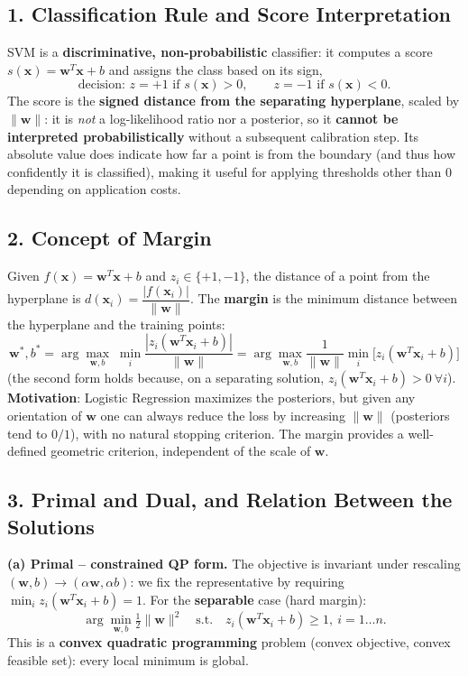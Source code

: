 \subsection*{1. Classification Rule and Score Interpretation}

SVM is a \textbf{discriminative, non-probabilistic} classifier: it computes a score $s(\mathbf{x})=\mathbf{w}^T\mathbf{x}+b$ and assigns the class based on its sign,
\[
\text{decision: } z=+1 \text{ if } s(\mathbf{x})>0,\qquad z=-1 \text{ if } s(\mathbf{x})<0 .
\]
The score is the \textbf{signed distance from the separating hyperplane}, scaled by $\|\mathbf{w}\|$: it is \emph{not} a log-likelihood ratio nor a posterior, so it \textbf{cannot be interpreted probabilistically} without a subsequent calibration step. Its absolute value does indicate how far a point is from the boundary (and thus how confidently it is classified), making it useful for applying thresholds other than $0$ depending on application costs.

\subsection*{2. Concept of Margin}

Given $f(\mathbf{x})=\mathbf{w}^T\mathbf{x}+b$ and $z_i\in\{+1,-1\}$, the distance of a point from the hyperplane is $d(\mathbf{x}_i)=\dfrac{|f(\mathbf{x}_i)|}{\|\mathbf{w}\|}$. The \textbf{margin} is the minimum distance between the hyperplane and the training points:
\[
\mathbf{w}^*,b^*=\arg\max_{\mathbf{w},b}\;\min_i\frac{|z_i(\mathbf{w}^T\mathbf{x}_i+b)|}{\|\mathbf{w}\|}=\arg\max_{\mathbf{w},b}\frac{1}{\|\mathbf{w}\|}\min_i\big[z_i(\mathbf{w}^T\mathbf{x}_i+b)\big]
\]
(the second form holds because, on a separating solution, $z_i(\mathbf{w}^T\mathbf{x}_i+b)>0\ \forall i$). \textbf{Motivation}: Logistic Regression maximizes the posteriors, but given any orientation of $\mathbf{w}$ one can always reduce the loss by increasing $\|\mathbf{w}\|$ (posteriors tend to $0/1$), with no natural stopping criterion. The margin provides a well-defined geometric criterion, independent of the scale of $\mathbf{w}$.

\subsection*{3. Primal and Dual, and Relation Between the Solutions}

\textbf{(a) Primal -- constrained QP form.} The objective is invariant under rescaling $(\mathbf{w},b)\to(\alpha\mathbf{w},\alpha b)$: we fix the representative by requiring $\min_i z_i(\mathbf{w}^T\mathbf{x}_i+b)=1$. For the \textbf{separable} case (hard margin):
\[
\arg\min_{\mathbf{w},b}\tfrac12\|\mathbf{w}\|^2\quad\text{s.t.}\quad z_i(\mathbf{w}^T\mathbf{x}_i+b)\ge1,\ i=1\ldots n .
\]
This is a \textbf{convex quadratic programming} problem (convex objective, convex feasible set): every local minimum is global.

